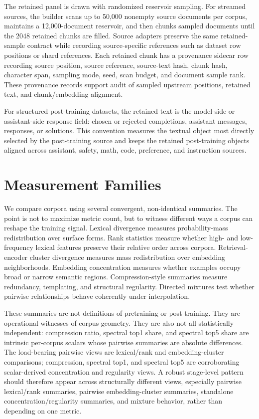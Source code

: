 \documentclass[11pt]{article}
\begin{document}
The retained panel is drawn with randomized reservoir sampling. For streamed sources, the builder scans up to 50,000 nonempty source documents per corpus, maintains a 12,000-document reservoir, and then chunks sampled documents until the 2048 retained chunks are filled. Source adapters preserve the same retained-sample contract while recording source-specific references such as dataset row positions or shard references. Each retained chunk has a provenance sidecar row recording source position, source reference, source-text hash, chunk hash, character span, sampling mode, seed, scan budget, and document sample rank. These provenance records support audit of sampled upstream positions, retained text, and chunk/embedding alignment.

For structured post-training datasets, the retained text is the model-side or assistant-side response field: chosen or rejected completions, assistant messages, responses, or solutions. This convention measures the textual object most directly selected by the post-training source and keeps the retained post-training objects aligned across assistant, safety, math, code, preference, and instruction sources.

\section{Measurement Families}\label{measurement-families}

We compare corpora using several convergent, non-identical summaries. The point is not to maximize metric count, but to witness different ways a corpus can reshape the training signal. Lexical divergence measures probability-mass redistribution over surface forms. Rank statistics measure whether high- and low-frequency lexical features preserve their relative order across corpora. Retrieval-encoder cluster divergence measures mass redistribution over embedding neighborhoods. Embedding concentration measures whether examples occupy broad or narrow semantic regions. Compression-style summaries measure redundancy, templating, and structural regularity. Directed mixtures test whether pairwise relationships behave coherently under interpolation.

These summaries are not definitions of pretraining or post-training. They are operational witnesses of corpus geometry. They are also not all statistically independent: compression ratio, spectral top1 share, and spectral top5 share are intrinsic per-corpus scalars whose pairwise summaries are absolute differences. The load-bearing pairwise views are lexical/rank and embedding-cluster comparisons; compression, spectral top1, and spectral top5 are corroborating scalar-derived concentration and regularity views. A robust stage-level pattern should therefore appear across structurally different views, especially pairwise lexical/rank summaries, pairwise embedding-cluster summaries, standalone concentration/regularity summaries, and mixture behavior, rather than depending on one metric.
\end{document}
